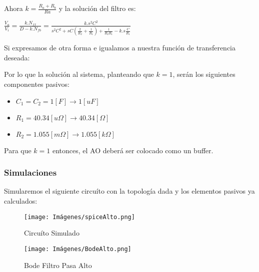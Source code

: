     Ahora $k = \frac{R_a + R_b}{Ra}$ y la solución del filtro es:\\

    \begin{center}
        \large{$\frac{V_o}{V_i} = \frac{k.N_{ff}}{D-k.N_{fb}} = \frac{k.s^2C^2}{s^2C^2 + sC(\frac{2}{R_2}+\frac{1}{R_1})+\frac{1}{R_2R_1} - k.s\frac{C}{R_1}}$}
    \end{center}

    Si expresamos de otra forma e igualamos a nuestra función de transferencia deseada:\\

    \begin{center}
    \end{center}

    Por lo que la solución al sistema, planteando que $k=1$, serán los siguientes componentes pasivos:\\

    \begin{itemize}
        \item $C_1 = C_2 = 1 [F] \xrightarrow{} 1 [uF]$
        \item $R_1 = 40.34 [u\Omega] \xrightarrow{} 40.34 [\Omega]$
        \item $R_2 = 1.055 [m\Omega] \xrightarrow{} 1.055 [k\Omega]$
    \end{itemize}

    Para que $k=1$ entonces, el AO deberá ser colocado como un buffer.\\
    \newpage
    \subsubsection{Simulaciones}
    Simularemos el siguiente circuíto con la topología dada y los elementos pasivos ya calculados:\\

    \begin{figure}[ht]
        \centering
        \texttt{[image: Imágenes/spiceAlto.png]}
        \caption{Circuíto Simulado}
    \end{figure}
    
    \begin{figure}[ht]
        \centering
        \texttt{[image: Imágenes/BodeAlto.png]}
        \caption{Bode Filtro Pasa Alto}
    \end{figure}
    
